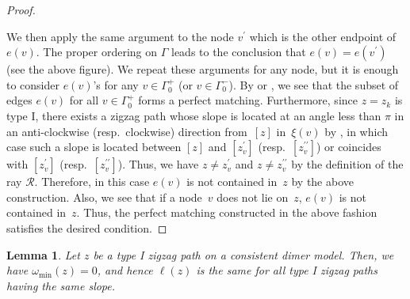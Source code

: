 \documentclass[pdftex]{sigma}%
\numberwithin{equation}{section}
\numberwithin{figure}{section}
\numberwithin{table}{section}
\newtheorem{Lemma}[Theorem]{Lemma}
\newcommand{\calR}{\mathcal{R}}
\begin{document}
\begin{proof}
\begin{center}
{{
} }
\end{center}

We then apply the same argument to the node $v^\prime$ which is the other endpoint of $e(v)$.
The proper ordering on $\Gamma$ leads to the conclusion that $e(v)=e(v^\prime)$ (see the above figure).
We repeat these arguments for any node, but it is enough to consider $e(v)$'s for any $v\in\Gamma^+_0$ (or $v\in\Gamma^-_0$).
By \cite[Section~3.2]{Gul} or \cite[Lemma~4.19]{Bro}, we see that the subset of edges $e(v)$ for all $v\in\Gamma^+_0$ forms a perfect matching.
Furthermore, since $z=z_k$ is type I, there exists a zigzag path whose slope is located at an angle less than $\pi$ in an anti-clockwise (resp.\ clockwise) direction from~$[z]$ in~$\xi(v)$ by \cite[Lemma~4.11 and its proof]{Bro}, in which case such a slope is located between $[z]$ and $[z^\prime_v]$ (resp.~$[z^{\prime\prime}_v]$) or coincides with $[z^\prime_v]$ (resp.~$[z^{\prime\prime}_v]$). Thus, we have $z\neq z^\prime_v$ and $z\neq z^{\prime\prime}_v$ by the definition of the ray $\calR$.
Therefore, in this case $e(v)$ is not contained in~$z$ by the above construction.
Also, we see that if a node~$v$ does not lie on~$z$, $e(v)$ is not contained in~$z$.
Thus, the perfect matching constructed in the above fashion satisfies the desired condition.
\end{proof}

\begin{Lemma}\label{lem_same_length}
Let $z$ be a type I zigzag path on a consistent dimer model.
Then, we have $\omega_{\min}(z)=0$, and hence $\ell(z)$ is the same for all type I zigzag paths having the same slope.
\end{Lemma}
\end{document}

